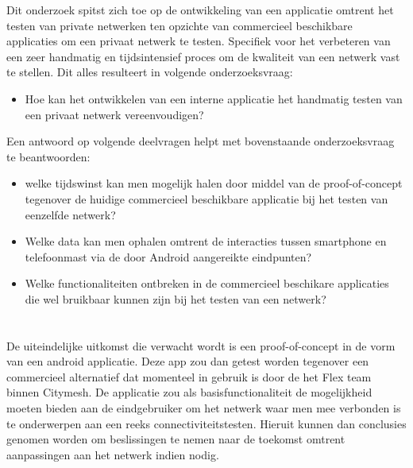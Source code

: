 Dit onderzoek spitst zich toe op de ontwikkeling van een applicatie omtrent het testen van private netwerken ten opzichte van commercieel beschikbare applicaties om een privaat netwerk te testen. Specifiek voor het verbeteren van een zeer handmatig en tijdsintensief proces om de kwaliteit van een netwerk vast te stellen. Dit alles resulteert in volgende onderzoeksvraag:
\begin{itemize}
    \item Hoe kan het ontwikkelen van een interne applicatie het handmatig testen van een privaat netwerk vereenvoudigen?
\end{itemize}



Een antwoord op volgende deelvragen helpt met bovenstaande onderzoeksvraag te beantwoorden:

\begin{itemize}
    \item welke tijdswinst kan men mogelijk halen door middel van de proof-of-concept tegenover de huidige commercieel beschikbare applicatie bij het testen van eenzelfde netwerk?
    \item Welke data kan men ophalen omtrent de interacties tussen smartphone en telefoonmast via de door Android aangereikte eindpunten?
    \item Welke functionaliteiten ontbreken in de commercieel beschikare applicaties die wel bruikbaar kunnen zijn bij het testen van een netwerk?
\end{itemize}

\section{}%
\label{sec:onderzoeksdoelstelling}


De uiteindelijke uitkomst die verwacht wordt is een proof-of-concept in de vorm van een android applicatie. Deze app zou dan getest worden tegenover een commercieel alternatief dat momenteel in gebruik is door de het Flex team binnen Citymesh. De applicatie zou als basisfunctionaliteit de mogelijkheid moeten bieden aan de eindgebruiker om het netwerk waar men mee verbonden is te onderwerpen aan een reeks connectiviteitstesten. Hieruit kunnen dan conclusies genomen worden om beslissingen te nemen naar de toekomst omtrent aanpassingen aan het netwerk indien nodig.

